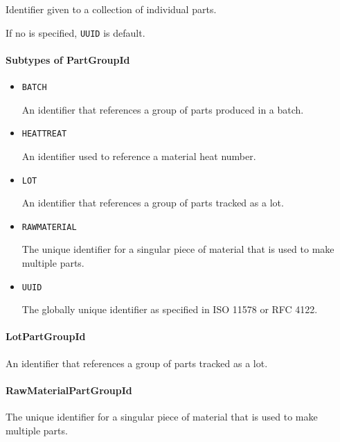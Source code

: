 Identifier given to a collection of individual parts. 

If no  is specified, \texttt{UUID} is default.


\paragraph{Subtypes of PartGroupId}\mbox{}
\label{sec:Subtypes of PartGroupId}

\begin{itemize}

\item \texttt{BATCH}


An identifier that references a group of parts produced in a batch.

\item \texttt{HEAT\textunderscore TREAT}


An identifier used to reference a material heat number.

\item \texttt{LOT}


An identifier that references a group of parts tracked as a lot.


\item \texttt{RAW\textunderscore MATERIAL}


The unique identifier for a singular piece of material that is used to make multiple parts.


\item \texttt{UUID}


The globally unique identifier as specified in ISO 11578 or RFC 4122.


\end{itemize}

\paragraph{LotPartGroupId}\mbox{}
\label{sec:LotPartGroupId}


An identifier that references a group of parts tracked as a lot.



\paragraph{RawMaterialPartGroupId}\mbox{}
\label{sec:RawMaterialPartGroupId}


The unique identifier for a singular piece of material that is used to make multiple parts.



